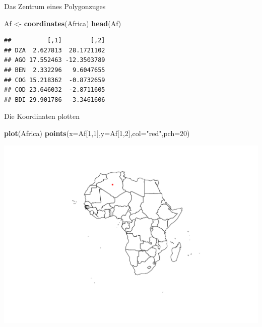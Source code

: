 \documentclass[ignorenonframetext,]{beamer}
\newenvironment{Shaded}{\begin{snugshade}}{\end{snugshade}}
\newcommand{\DataTypeTok}[1]{\textcolor[rgb]{0.13,0.29,0.53}{#1}}
\newcommand{\DecValTok}[1]{\textcolor[rgb]{0.00,0.00,0.81}{#1}}
\newcommand{\KeywordTok}[1]{\textcolor[rgb]{0.13,0.29,0.53}{\textbf{#1}}}
\newcommand{\NormalTok}[1]{#1}
\newcommand{\StringTok}[1]{\textcolor[rgb]{0.31,0.60,0.02}{#1}}
\begin{document}
\begin{frame}[fragile]{Das Zentrum eines Polygonzuges}
\protect\hypertarget{das-zentrum-eines-polygonzuges}{}

\begin{Shaded}
\begin{Highlighting}[]
\NormalTok{Af <-}\StringTok{ }\KeywordTok{coordinates}\NormalTok{(Africa)}
\KeywordTok{head}\NormalTok{(Af)}
\end{Highlighting}
\end{Shaded}

\begin{verbatim}
##          [,1]        [,2]
## DZA  2.627813  28.1721102
## AGO 17.552463 -12.3503789
## BEN  2.332296   9.6047655
## COG 15.218362  -0.8732659
## COD 23.646032  -2.8711605
## BDI 29.901786  -3.3461606
\end{verbatim}

\end{frame}

\begin{frame}[fragile]{Die Koordinaten plotten}
\protect\hypertarget{die-koordinaten-plotten}{}

\begin{Shaded}
\begin{Highlighting}[]
\KeywordTok{plot}\NormalTok{(Africa)}
\KeywordTok{points}\NormalTok{(}\DataTypeTok{x=}\NormalTok{Af[}\DecValTok{1}\NormalTok{,}\DecValTok{1}\NormalTok{],}\DataTypeTok{y=}\NormalTok{Af[}\DecValTok{1}\NormalTok{,}\DecValTok{2}\NormalTok{],}\DataTypeTok{col=}\StringTok{"red"}\NormalTok{,}\DataTypeTok{pch=}\DecValTok{20}\NormalTok{)}
\end{Highlighting}
\end{Shaded}

\includegraphics{A7_spdep_files/figure-beamer/unnamed-chunk-12-1.pdf}

\end{frame}
\end{document}
